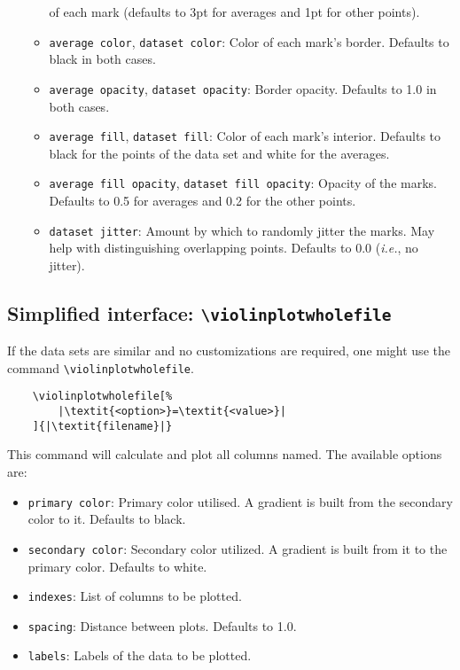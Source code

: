 \documentclass{article}
\begin{document}
\begin{itemize}
\begin{itemize}
			of each mark (defaults to 3pt for averages and 1pt
			for other points).
		\item \texttt{average color}, \texttt{dataset color}: Color
			of each mark's border. Defaults to black in both
			cases.
		\item \texttt{average opacity}, \texttt{dataset opacity}:
			Border opacity. Defaults to 1.0 in both cases.
		\item \texttt{average fill}, \texttt{dataset fill}: Color
			of each mark's interior. Defaults to black for the
			points of the data set and white for the averages.
		\item \texttt{average fill opacity}, \texttt{dataset fill opacity}:
			Opacity of the marks. Defaults to 0.5 for averages and
			0.2 for the other points.
		\item \texttt{dataset jitter}:
			Amount by which to randomly jitter the marks. May help with distinguishing overlapping points. Defaults to $0.0$ (\textit{i.e.}, no jitter).
	\end{itemize}
\end{itemize}

\subsection{Simplified interface: \texttt{{\textbackslash}violinplotwholefile}}

If the data sets are similar and no customizations are required, one might
use the command \texttt{{\textbackslash}violinplotwholefile}.

\begin{verbatim}
	\violinplotwholefile[%
		|\textit{<option>}=\textit{<value>}|
	]{|\textit{filename}|}
\end{verbatim}

This command will calculate and plot all columns named. The available options
are:

\begin{itemize}
	\item \texttt{primary color}: Primary color utilised. A gradient is built from
		the secondary color to it. Defaults to black.
	\item \texttt{secondary color}: Secondary color utilized. A
		gradient is built from it to the primary color. Defaults
		to white.
	\item \texttt{indexes}: List of columns to be plotted.
	\item \texttt{spacing}: Distance between plots. Defaults to 1.0.
	\item \texttt{labels}: Labels of the data to be plotted.
\end{itemize}
\end{document}
